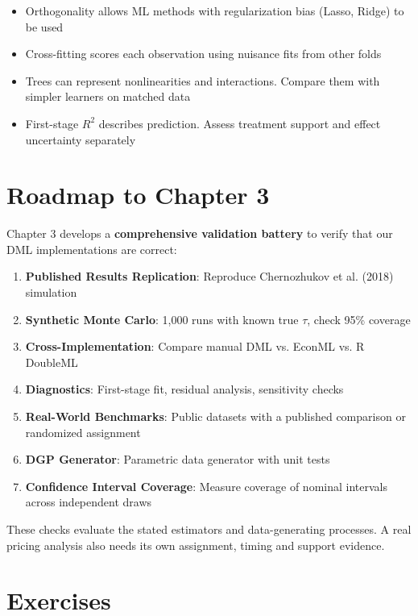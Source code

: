 \begin{itemize}
\item
  Orthogonality allows ML methods with regularization bias (Lasso,
  Ridge) to be used
\item
  Cross-fitting scores each observation using nuisance fits from other folds
\item
  Trees can represent nonlinearities and interactions. Compare them with simpler learners on matched data
\item
  First-stage $R^2$ describes prediction. Assess treatment support and effect uncertainty separately
\end{itemize}

\section{Roadmap to Chapter 3}\label{_roadmap_to_chapter_3}

Chapter 3 develops a \textbf{comprehensive validation battery} to verify
that our DML implementations are correct:

\begin{enumerate}
\def\labelenumi{\arabic{enumi}.}
\item
  \textbf{Published Results Replication}: Reproduce Chernozhukov et al.
  (2018) simulation
\item
  \textbf{Synthetic Monte Carlo}: 1,000 runs with known true \(\tau\),
  check 95\% coverage
\item
  \textbf{Cross-Implementation}: Compare manual DML vs. EconML vs. R
  DoubleML
\item
  \textbf{Diagnostics}: First-stage fit, residual analysis, sensitivity
  checks
\item
  \textbf{Real-World Benchmarks}: Public datasets with a published comparison or randomized assignment
\item
  \textbf{DGP Generator}: Parametric data generator with unit tests
\item
  \textbf{Confidence Interval Coverage}: Measure coverage of nominal intervals across independent draws
\end{enumerate}

These checks evaluate the stated estimators and data-generating processes. A real pricing analysis also needs its own assignment, timing and support evidence.

\section{Exercises}\label{sec:ch02_exercises}

